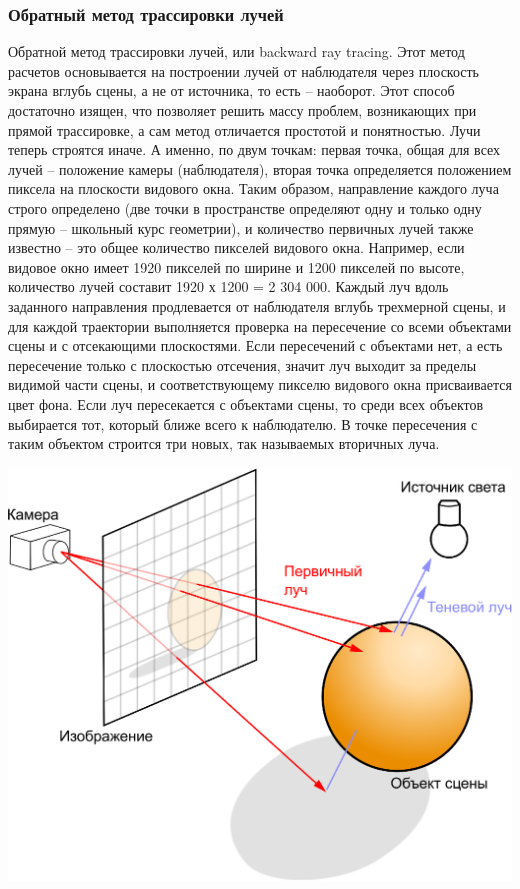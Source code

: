 \documentclass[12pt, a4paper]{article}
\begin{document}
\subsubsection{Обратный метод трассировки лучей}
Обратной метод трассировки лучей, или backward ray tracing. Этот метод расчетов основывается на построении лучей от наблюдателя через плоскость экрана вглубь сцены, а не от источника, то есть -- наоборот. Этот способ достаточно изящен, что позволяет решить массу проблем, возникающих при прямой трассировке, а сам метод отличается простотой и понятностью. Лучи теперь строятся иначе. А именно, по двум точкам: первая точка, общая для всех лучей – положение камеры (наблюдателя), вторая точка определяется положением пиксела на плоскости видового окна. Таким образом, направление каждого луча строго определено (две точки в пространстве определяют одну и только одну прямую – школьный курс геометрии), и количество первичных лучей также известно – это общее количество пикселей видового окна. Например, если видовое окно имеет 1920 пикселей по ширине и 1200 пикселей по высоте, количество лучей составит 1920 х 1200 = 2 304 000. Каждый луч
вдоль заданного направления продлевается от наблюдателя вглубь трехмерной сцены, и для каждой траектории выполняется проверка на пересечение со всеми объектами сцены и с отсекающими плоскостями. Если пересечений с объектами нет, а есть пересечение только с плоскостью отсечения, значит луч выходит за пределы видимой части сцены, и соответствующему пикселю видового окна присваивается цвет фона. Если луч пересекается с объектами сцены, то среди всех объектов выбирается тот, который ближе всего к наблюдателю. В точке пересечения с таким объектом строится три новых, так называемых вторичных луча. \par

\begin{center}
\includegraphics[scale=0.5]{imgs/Ray_trace_diagram_rus.eps} 
\end{center}
\end{document}

